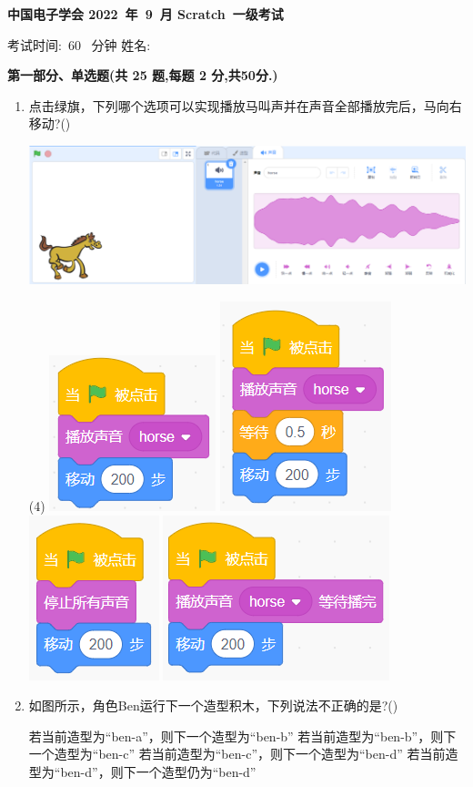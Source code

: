 \documentclass[10pt, a4paper]{article}
\newcommand{\Title}[3]{
    \begin{center}
        \Large \textbf{中国电子学会 #1~年~#2~月 Scratch~#3级考试}
    \end{center}
}
\newcommand{\TimeAndName}[1]{
    \begin{center}
        考试时间:~#1~ 分钟 \qquad\qquad\qquad\qquad 姓名:\underline{\quad\quad\quad\quad}
    \end{center}
}
\begin{document}
    \Title{2022}{9}{一} %
    \TimeAndName{60} %

    \vspace{2mm}
    {\noindent\textbf{第一部分、单选题(共 25 题,每题 2 分,共50分.)}}
    \begin{enumerate}
        \item 点击绿旗，下列哪个选项可以实现播放马叫声并在声音全部播放完后，马向右移动?(\qquad)
        \begin{center}
            \includegraphics[width=.8\textwidth]{1.png}
        \end{center}
        \begin{tasks}(4)
            \task \includegraphics[width=.15\textwidth]{1a.png}
            \task \includegraphics[width=.12\textwidth]{1b.png}
            \task \includegraphics[width=.12\textwidth]{1c.png}
            \task \includegraphics[width=.18\textwidth]{1d.png}
        \end{tasks}

        \item 如图所示，角色Ben运行下一个造型积木，下列说法不正确的是?(\qquad)
        \begin{tasks}
            \task 若当前造型为“ben-a”，则下一个造型为“ben-b”
            \task 若当前造型为“ben-b”，则下一个造型为“ben-c”
            \task 若当前造型为“ben-c”，则下一个造型为“ben-d”
            \task 若当前造型为“ben-d”，则下一个造型仍为“ben-d”
        \end{tasks}


\end{enumerate}
\end{document}
